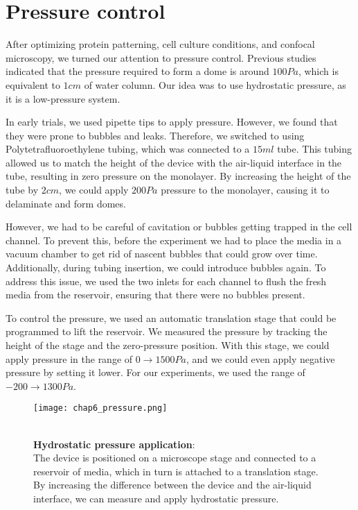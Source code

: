 \hypertarget{pressure-control}{%
\section{Pressure control}\label{pressure-control}}

After optimizing protein patterning, cell culture conditions, and
confocal microscopy, we turned our attention to pressure control.
Previous studies indicated that the pressure required to form a dome is
around \(100Pa\), which is equivalent to \(1cm\) of water column. Our
idea was to use hydrostatic pressure, as it is a low-pressure system.

In early trials, we used pipette tips to apply pressure. However, we
found that they were prone to bubbles and leaks. Therefore, we switched
to using Polytetrafluoroethylene tubing, which was connected to a
\(15ml\) tube. This tubing allowed us to match the height of the device
with the air-liquid interface in the tube, resulting in zero pressure on
the monolayer. By increasing the height of the tube by \(2cm\), we could
apply \(200Pa\) pressure to the monolayer, causing it to delaminate and
form domes.

However, we had to be careful of cavitation or bubbles getting trapped
in the cell channel. To prevent this, before the experiment we had to
place the media in a vacuum chamber to get rid of nascent bubbles that
could grow over time. Additionally, during tubing insertion, we could
introduce bubbles again. To address this issue, we used the two inlets
for each channel to flush the fresh media from the reservoir, ensuring
that there were no bubbles present.

To control the pressure, we used an automatic translation stage that
could be programmed to lift the reservoir. We measured the pressure by
tracking the height of the stage and the zero-pressure position. With
this stage, we could apply pressure in the range of
\(0\rightarrow 1500Pa\), and we could even apply negative pressure by
setting it lower. For our experiments, we used the range of
\(-200\rightarrow 1300Pa\).

\begin{figure}
	\begin{minipage}[c]{0.6\textwidth}
		\texttt{[image: chap6\_pressure.png]}
	\end{minipage}\hfill
	\begin{minipage}[c]{0.35\textwidth}
		\caption{\\ \textbf{Hydrostatic pressure application}:\\ The device is positioned on a microscope stage and connected to a reservoir of media, which in turn is attached to a translation stage. By increasing the difference between the device and the air-liquid interface, we can measure and apply hydrostatic pressure.
		} \label{fig_6_3}
	\end{minipage}
\end{figure}


